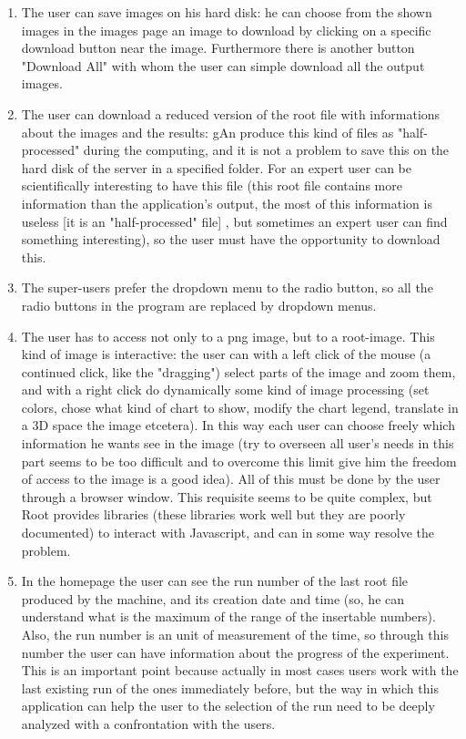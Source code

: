 \begin{enumerate}
\item The user can save images on his hard disk: he can choose from the shown images in the images page an image to download by clicking on a specific download button near the image. Furthermore there is another button "Download All" with whom the user can simple download all the output images.

\item The user can download a reduced version of the root file with informations about the images and the results: gAn produce this kind of files as "half-processed" during the computing, and it is not a problem to save this on the hard disk of the server in a specified folder. For an expert user can be scientifically interesting to have this file (this root file contains more information than the application's output, the most of this information is useless [it is an "half-processed" file] , but sometimes an expert user can find something interesting), so the user must have the opportunity to download this.     

\item The super-users prefer the dropdown menu to the radio button, so all the radio buttons in the program are replaced by dropdown menus.

\item The user has to access not only to a png image, but to a root-image. This kind of image is interactive: the user can with a left click of the mouse (a continued click, like the "dragging") select parts of the image and zoom them, and with a right click do dynamically some kind of image processing (set colors, chose  what kind of chart to show, modify the chart legend, translate in a 3D space the image etcetera). In this way each user can choose freely which information he wants see in the image (try to overseen all user's needs in this part seems to be too difficult and to overcome this limit give him the freedom of access to the image is a good idea).
All of this must be done by the user through a browser window. This requisite seems to be quite complex, but Root provides libraries (these libraries work well but they are poorly documented) to interact with Javascript, and can in some way resolve the problem.  

\item In the homepage the user can see the run number of the last root file produced by the machine, and its creation date and time (so, he can understand what is the maximum of the range of the insertable numbers). Also, the run number is an unit of measurement of the time, so through this number the user can have information about the progress of the experiment. This is an important point because actually in most cases users work with the last existing run of the ones immediately before, but the way in which this application can help the user to the selection of the run need to be deeply analyzed with a confrontation with the users. 


\end{enumerate}
